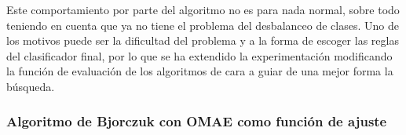 Este comportamiento por parte del algoritmo no es para nada normal, sobre todo teniendo en cuenta que ya no tiene el problema del desbalanceo de clases. Uno de los motivos puede ser la dificultad del problema y a la forma de escoger las reglas del clasificador final, por lo que se ha extendido la experimentación modificando la función de evaluación de los algoritmos de cara a guiar de una mejor forma la búsqueda.

\subsubsection{Algoritmo de Bjorczuk con OMAE como función de ajuste}



\begin{table}[H]
\centering
{}
\end{table}
